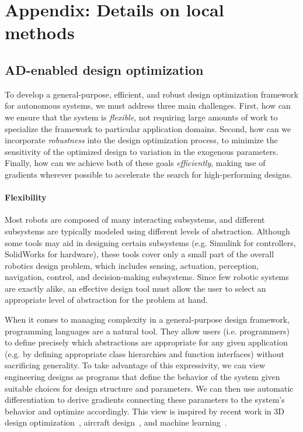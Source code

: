 \section{Appendix: Details on local methods}

\subsection{AD-enabled design optimization}

To develop a general-purpose, efficient, and robust design optimization framework for autonomous systems, we must address three main challenges. First, how can we ensure that the system is \textit{flexible}, not requiring large amounts of work to specialize the framework to particular application domains. Second, how can we incorporate \textit{robustness} into the design optimization process, to minimize the sensitivity of the optimized design to variation in the exogenous parameters. Finally, how can we achieve both of these goals \textit{efficiently}, making use of gradients wherever possible to accelerate the search for high-performing designs.

\paragraph{Flexibility} Most robots are composed of many interacting subsystems, and different subsystems are typically modeled using different levels of abstraction. Although some tools may aid in designing certain subsystems (e.g. Simulink for controllers, SolidWorks for hardware), these tools cover only a small part of the overall robotics design problem, which includes sensing, actuation, perception, navigation, control, and decision-making subsystems. Since few robotic systems are exactly alike, an effective design tool must allow the user to select an appropriate level of abstraction for the problem at hand.

When it comes to managing complexity in a general-purpose design framework, programming languages are a natural tool. They allow users (i.e. programmers) to define precisely which abstractions are appropriate for any given application (e.g. by defining appropriate class hierarchies and function interfaces) without sacrificing generality. To take advantage of this expressivity, we can view engineering designs as programs that define the behavior of the system given suitable choices for design structure and parameters. We can then use automatic differentiation to derive gradients connecting these parameters to the system's behavior and optimize accordingly. This view is inspired by recent work in 3D design optimization~\cite{cascaval2021differentiable}, aircraft design~\cite{sharpe_thesis}, and machine learning~\cite{paszkePyTorchImperativeStyle2019,jax2018github}.

